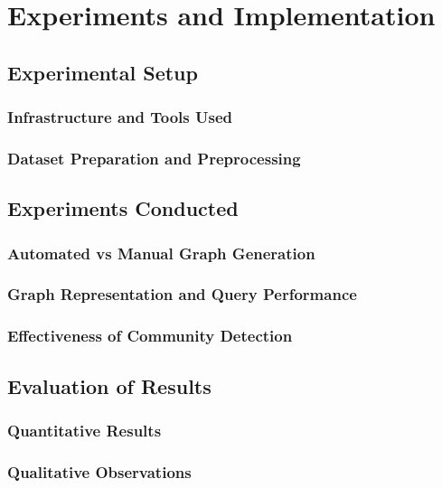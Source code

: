 \section{Experiments and Implementation}
\subsection{Experimental Setup}
\subsubsection{Infrastructure and Tools Used}
\subsubsection{Dataset Preparation and Preprocessing}
\subsection{Experiments Conducted}
\subsubsection{Automated vs Manual Graph Generation}
\subsubsection{Graph Representation and Query Performance}
\subsubsection{Effectiveness of Community Detection}
\subsection{Evaluation of Results}
\subsubsection{Quantitative Results}
\subsubsection{Qualitative Observations}
